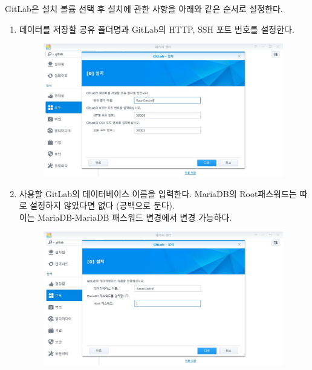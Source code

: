 \documentclass[11pt
  , a4paper
  , article
  , oneside
]{memoir}
\begin{document}
GitLab은 설치 볼륨 선택 후 설치에 관한 사항을 아래와 같은 순서로 설정한다.
\begin{enumerate}
\item 데이터를 저장할 공유 폴더명과 GitLab의 HTTP, SSH 포트 번호를 설정한다.
\begin{figure}[h!]
	\centering
	\includegraphics[width=0.99\textwidth]{./images/2.JPG}   
\end{figure}
\clearpage

\item 사용할 GitLab의 데이터베이스 이름을 입력한다. 
MariaDB의 Root패스워드는 따로 설정하지 않았다면 없다 (공백으로 둔다).\\ 
이는 MariaDB-MariaDB 패스워드 변경에서 변경 가능하다.
\begin{figure}[h!]
	\centering
	\includegraphics[width=0.99\textwidth]{./images/3.JPG}   
\end{figure}
\clearpage


\end{enumerate}
\end{document}
